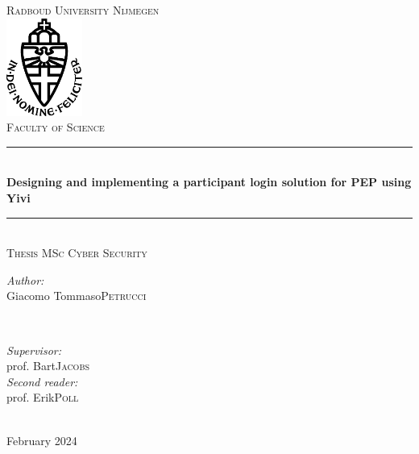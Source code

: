 \documentclass{report}
\title{\thesistitle}
\author{\thesisauthorfirst\space\thesisauthorsecond}
\date{\thesisdate}
\def\thesistitle{Designing and implementing a participant login solution for PEP using Yivi}
\def\thesisauthorfirst{Giacomo Tommaso}
\def\thesisauthorsecond{Petrucci}
\def\thesissupervisorfirst{prof. Bart}
\def\thesissupervisorsecond{Jacobs}
\def\thesissecondreaderfirst{prof. Erik}
\def\thesissecondreadersecond{Poll}
\def\thesisdate{February 2024}
\begin{document}
\begin{titlepage}
	\thispagestyle{empty}
	\newcommand{\HRule}{\rule{\linewidth}{0.5mm}}
	\center
	\textsc{\Large Radboud University Nijmegen}\\[.7cm]
	\includegraphics[width=25mm]{in_dei_nomine_feliciter.eps}\\[.5cm]
	\textsc{Faculty of Science}\\[0.5cm]
	
	\HRule \\[0.4cm]
	{ \huge \bfseries \thesistitle}\\[0.1cm]
	\HRule \\[.5cm]
	\textsc{\large Thesis MSc Cyber Security}\\[.5cm]
	
	\begin{minipage}{0.4\textwidth}
	\begin{flushleft} \large
	\emph{Author:}\\
	\thesisauthorfirst\space \textsc{\thesisauthorsecond}
	\end{flushleft}
	\end{minipage}
	~
	\begin{minipage}{0.4\textwidth}
	\begin{flushright} \large
	\emph{Supervisor:} \\
	\thesissupervisorfirst\space \textsc{\thesissupervisorsecond} \\[1em]
	\emph{Second reader:} \\
	\thesissecondreaderfirst\space \textsc{\thesissecondreadersecond}
	\end{flushright}
	\end{minipage}\\[4cm]
	\vfill
	{\large \thesisdate}\\
	\clearpage
\end{titlepage}

\begin{abstract}
	Polymorphic Encryption and Pseudonimisation (PEP) is both a technology and a project developed at iHub to let researcher collect medical data of people taking part in studies, 
	while preserving their privacy. To do so, it uses ElGamal cipher's properties that allow to re-key and re-shuffle encrypted data and participant identifiers called local 
	pseudonyms. While this system effectively safeguards a participant's privacy, it also makes it non-trivial to design a way for the participants to access their own data: due to 
	PEP's privacy goals, the typical login with email and password is out of the question. This thesis presents a conceptual design for a login system for study participants that
	is in line with PEP's data protection goals and a proof of concept implementation of such system. 
\end{abstract}
\end{document}
